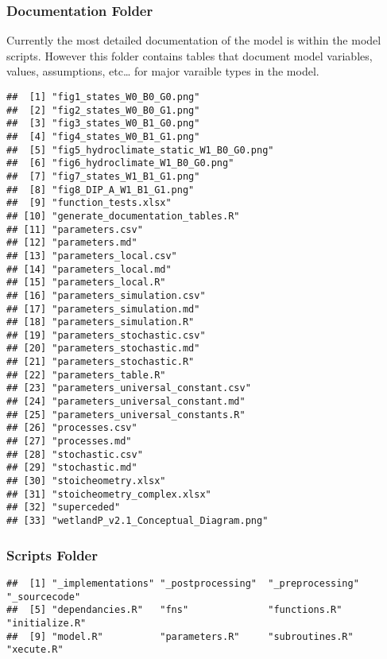 \documentclass[
]{article}
\begin{document}
\hypertarget{documentation-folder}{%
\subsubsection{Documentation Folder}\label{documentation-folder}}

Currently the most detailed documentation of the model is within the
model scripts. However this folder contains tables that document model
variables, values, assumptions, etc\ldots{} for major varaible types in
the model.

\begin{verbatim}
##  [1] "fig1_states_W0_B0_G0.png"             
##  [2] "fig2_states_W0_B0_G1.png"             
##  [3] "fig3_states_W0_B1_G0.png"             
##  [4] "fig4_states_W0_B1_G1.png"             
##  [5] "fig5_hydroclimate_static_W1_B0_G0.png"
##  [6] "fig6_hydroclimate_W1_B0_G0.png"       
##  [7] "fig7_states_W1_B1_G1.png"             
##  [8] "fig8_DIP_A_W1_B1_G1.png"              
##  [9] "function_tests.xlsx"                  
## [10] "generate_documentation_tables.R"      
## [11] "parameters.csv"                       
## [12] "parameters.md"                        
## [13] "parameters_local.csv"                 
## [14] "parameters_local.md"                  
## [15] "parameters_local.R"                   
## [16] "parameters_simulation.csv"            
## [17] "parameters_simulation.md"             
## [18] "parameters_simulation.R"              
## [19] "parameters_stochastic.csv"            
## [20] "parameters_stochastic.md"             
## [21] "parameters_stochastic.R"              
## [22] "parameters_table.R"                   
## [23] "parameters_universal_constant.csv"    
## [24] "parameters_universal_constant.md"     
## [25] "parameters_universal_constants.R"     
## [26] "processes.csv"                        
## [27] "processes.md"                         
## [28] "stochastic.csv"                       
## [29] "stochastic.md"                        
## [30] "stoicheometry.xlsx"                   
## [31] "stoicheometry_complex.xlsx"           
## [32] "superceded"                           
## [33] "wetlandP_v2.1_Conceptual_Diagram.png"
\end{verbatim}

\hypertarget{scripts-folder}{%
\subsubsection{Scripts Folder}\label{scripts-folder}}

\begin{verbatim}
##  [1] "_implementations" "_postprocessing"  "_preprocessing"   "_sourcecode"     
##  [5] "dependancies.R"   "fns"              "functions.R"      "initialize.R"    
##  [9] "model.R"          "parameters.R"     "subroutines.R"    "xecute.R"
\end{verbatim}
\end{document}

